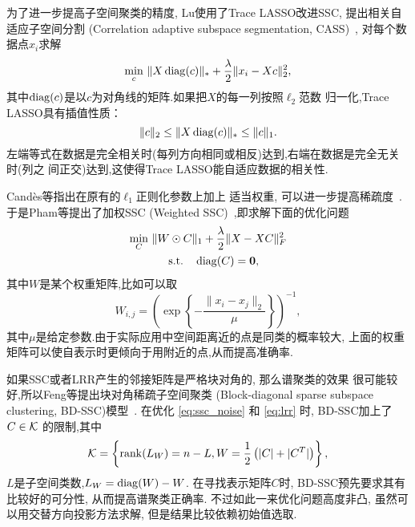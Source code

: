 为了进一步提高子空间聚类的精度, Lu使用了Trace LASSO改进SSC,
提出相关自适应子空间分割 (Correlation adaptive subspace
segmentation, CASS)~\cite{lu2013correlation}, 
对每个数据点\(x_i\)求解
\begin{equation}
  \min_{c}\, \|X\operatorname{diag}(c)\|_* + \frac{\lambda}{2}\|x_i - Xc\|_2^2,
  \label{eq:cass}
\end{equation}
其中\(\operatorname{diag}(c)\)是以\(c\)为对角线的矩阵.如果把\(X\)的每一列按照\(\ell_2\)范数
归一化,Trace LASSO具有插值性质：
\[
  \|c\|_2\le \|X\operatorname{diag}(c)\|_*\le \|c\|_1.
\]
左端等式在数据是完全相关时(每列方向相同或相反)达到,右端在数据是完全无关时(列之
间正交)达到,这使得Trace LASSO能自适应数据的相关性.

Cand\`{e}s等指出在原有的\(\ell_1\)正则化参数上加上
适当权重, 可以进一步提高稀疏度~\cite{candes2008enhancing}.
于是Pham等提出了加权SSC (Weighted SSC)~\cite{pham2012improved},即求解下面的优化问题
\begin{equation}
  \begin{gathered}
    \min_{C}\, \|W\odot C\|_1 + \frac{\lambda}{2}\|X-XC\|_F^2 \\
    \quad \text{s.t.}\quad \operatorname{diag}(C) = \mathbf{0},
  \end{gathered}
  \label{eq:wssc}
\end{equation}
其中\(W\)是某个权重矩阵,比如可以取
\[
  W_{i,j} = \left( \exp\left\{ -\frac{\|x_i-x_j\|_2}{\mu}
\right\} \right)^{-1},
\]
其中\(\mu\)是给定参数.由于实际应用中空间距离近的点是同类的概率较大,
上面的权重矩阵可以使自表示时更倾向于用附近的点,从而提高准确率.

如果SSC或者LRR产生的邻接矩阵是严格块对角的, 那么谱聚类的效果
很可能较好,所以Feng等提出块对角稀疏子空间聚类
(Block-diagonal sparse subspace clustering, BD-SSC)模型~\cite{feng2014robust}.
在优化 \eqref{eq:ssc_noise} 和 \eqref{eq:lrr} 时, BD-SSC加上了\(C \in \mathcal{K}\) 的限制,其中
\[
  \mathcal{K} = \left\{ \operatorname{rank}(L_W)=n-L, W=\frac{1}{2}\left( |C|+|C^T| \right) \right\},
\]
\(L\)是子空间类数,\(L_W=\operatorname{diag}(W)-W\).
在寻找表示矩阵\(C\)时, BD-SSC预先要求其有比较好的可分性, 从而提高谱聚类正确率. 
不过如此一来优化问题高度非凸, 虽然可以用交替方向投影方法求解, 但是结果比较依赖初始值选取.

